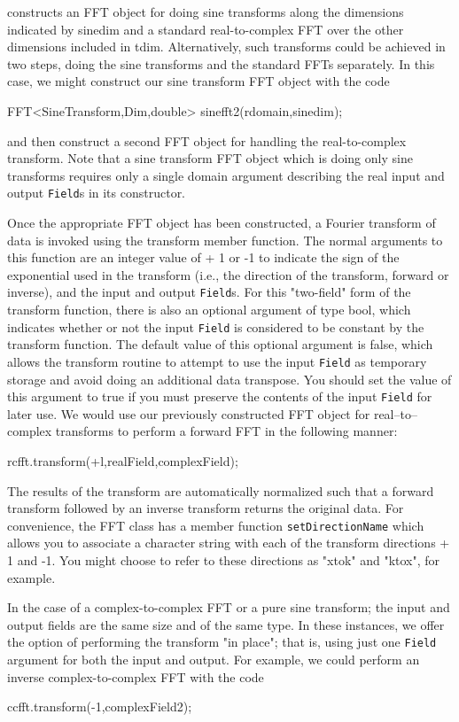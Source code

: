 constructs an FFT object for doing sine transforms along the dimensions indicated by sinedim and a standard real-to-complex FFT over the other dimensions included in tdim. Alternatively, such transforms could be achieved in two steps, doing the sine transforms and the standard FFTs separately. In this case, we might construct our sine transform FFT object with the code
\begin{smallcode}
FFT<SineTransform,Dim,double> sinefft2(rdomain,sinedim);
\end{smallcode}


and then construct a second FFT object for handling the real-to-complex transform. Note that a sine transform FFT object which is doing only sine transforms requires only a single domain argument describing the real input and output \texttt{Field}s in its constructor.

Once the appropriate FFT object has been constructed, a Fourier transform of data is invoked using the transform member function. The normal arguments to this function are an integer value of + 1 or -1 to indicate the sign of the exponential used in the transform (i.e., the direction of the transform, forward or inverse), and the input and output \texttt{Field}s. For this "two-field" form of the transform function, there is also an optional argument of type bool, which indicates whether or not the input \texttt{Field} is considered to be constant by the transform function. The default value of this optional argument is false, which allows the transform routine to attempt to use the input \texttt{Field} as temporary storage and avoid doing an additional data transpose. You should set the value of this argument to true if you must preserve the contents of the input \texttt{Field} for later use. We would use our previously constructed FFT object for real--to--complex transforms to perform a forward FFT in the following manner:
\begin{smallcode}
rcfft.transform(+l,realField,complexField);
\end{smallcode}


The results of the transform are automatically normalized such that a forward transform followed by an inverse transform returns the original data. For convenience, the FFT class has a member function \texttt{setDirectionName} which allows you to associate a character string with each of the transform directions + 1 and -1. You might choose to refer to these directions as "xtok" and "ktox", for example.

In the case of a complex-to-complex FFT or a pure sine transform; the input and output fields are the same size and of the same type. In these instances, we offer the option of performing the transform "in place"; that is, using just one \texttt{Field} argument for both the input and output. For example, we could perform an inverse complex-to-complex FFT with the code
\begin{smallcode}
ccfft.transform(-1,complexField2);
\end{smallcode}



